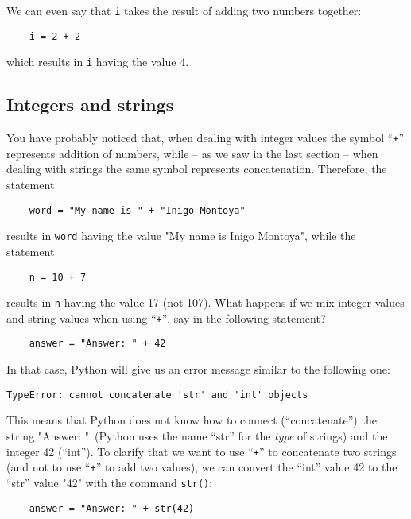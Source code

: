 We can even say that \verb.i. takes the result of adding two numbers
together:

\begin{Verbatim}
    i = 2 + 2
\end{Verbatim}

which results in \verb.i. having the value 4. 

\subsection*{Integers and strings}
\label{sec:intstr}

You have probably noticed that, when dealing with integer
values the symbol ``\texttt{+}'' represents addition of numbers, while -- as
we saw in the last section -- when dealing with strings the same
symbol represents concatenation. Therefore, the statement

\begin{Verbatim}
    word = "My name is " + "Inigo Montoya"
\end{Verbatim}

results in \verb+word+ having the value "My name is Inigo Montoya",
while the statement

\begin{Verbatim}
    n = 10 + 7
\end{Verbatim}

results in \verb+n+ having the value 17 (not 107). What happens if we
mix integer values and string values when using ``\texttt{+}'', say in the
following statement?

\begin{Verbatim}
    answer = "Answer: " + 42
\end{Verbatim}

In that case, Python will give us an error message similar to the
following one:

\begin{Verbatim}
TypeError: cannot concatenate 'str' and 'int' objects
\end{Verbatim}

This means that Python does not know how to connect (``concatenate'')
the string "Answer: "\ (Python uses the name ``str'' for the
\emph{type} of strings) and the integer 42 (``int'').
To clarify that we want to use ``\texttt{+}'' to concatenate two strings (and
not to use ``\texttt{+}'' to add two values), we can convert the ``int'' value
42 to the ``str'' value "42" with the command \verb!str()!:

\begin{verbatim}
    answer = "Answer: " + str(42)
\end{verbatim}

